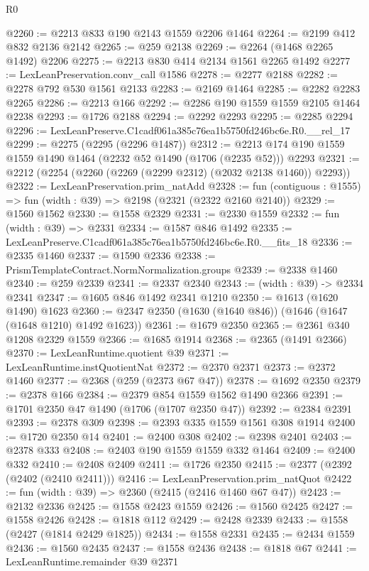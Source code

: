 \begin{lexlean}{R0}
\begin{coremodule}
@2260 := @2213 @833 @190 @2143 @1559 @2206 @1464
@2264 := @2199 @412 @832 @2136 @2142
@2265 := @259 @2138
@2269 := @2264 (@1468 @2265 @1492) @2206
@2275 := @2213 @830 @414 @2134 @1561 @2265 @1492
@2277 := LexLeanPreservation.conv_call @1586
@2278 := @2277 @2188
@2282 := @2278 @792 @530 @1561 @2133
@2283 := @2169 @1464
@2285 := @2282 @2283 @2265
@2286 := @2213 @166
@2292 := @2286 @190 @1559 @1559 @2105 @1464 @2238
@2293 := @1726 @2188
@2294 := @2292 @2293
@2295 := @2285 @2294
@2296 := LexLeanPreserve.C1cadf061a385c76ea1b5750fd246bc6e.R0.__rel_17
@2299 := @2275 (@2295 (@2296 @1487))
@2312 := @2213 @174 @190 @1559 @1559 @1490 @1464 (@2232 @52 @1490 (@1706 (@2235 @52))) @2293
@2321 := @2212 (@2254 (@2260 (@2269 (@2299 @2312) (@2032 @2138 @1460)) @2293))
@2322 := LexLeanPreservation.prim_natAdd
@2328 := fun (contiguous : @1555) => fun (width : @39) => @2198 (@2321 (@2322 @2160 @2140))
@2329 := @1560 @1562
@2330 := @1558 @2329
@2331 := @2330 @1559
@2332 := fun (width : @39) => @2331
@2334 := @1587 @846 @1492
@2335 := LexLeanPreserve.C1cadf061a385c76ea1b5750fd246bc6e.R0.__fits_18
@2336 := @2335 @1460
@2337 := @1590 @2336
@2338 := PrismTemplateContract.NormNormalization.groups
@2339 := @2338 @1460
@2340 := @259 @2339
@2341 := @2337 @2340
@2343 := (width : @39) -> @2334 @2341
@2347 := @1605 @846 @1492 @2341 @1210
@2350 := @1613 (@1620 @1490) @1623
@2360 := @2347 @2350 (@1630 (@1640 @846)) (@1646 (@1647 (@1648 @1210) @1492 @1623))
@2361 := @1679 @2350
@2365 := @2361 @340 @1208 @2329 @1559
@2366 := @1685 @1914
@2368 := @2365 (@1491 @2366)
@2370 := LexLeanRuntime.quotient @39
@2371 := LexLeanRuntime.instQuotientNat
@2372 := @2370 @2371
@2373 := @2372 @1460
@2377 := @2368 (@259 (@2373 @67 @47))
@2378 := @1692 @2350
@2379 := @2378 @166
@2384 := @2379 @854 @1559 @1562 @1490 @2366
@2391 := @1701 @2350 @47 @1490 (@1706 (@1707 @2350 @47))
@2392 := @2384 @2391
@2393 := @2378 @309
@2398 := @2393 @335 @1559 @1561 @308 @1914
@2400 := @1720 @2350 @14
@2401 := @2400 @308
@2402 := @2398 @2401
@2403 := @2378 @333
@2408 := @2403 @190 @1559 @1559 @332 @1464
@2409 := @2400 @332
@2410 := @2408 @2409
@2411 := @1726 @2350
@2415 := @2377 (@2392 (@2402 (@2410 @2411)))
@2416 := LexLeanPreservation.prim_natQuot
@2422 := fun (width : @39) => @2360 (@2415 (@2416 @1460 @67 @47))
@2423 := @2132 @2336
@2425 := @1558 @2423 @1559
@2426 := @1560 @2425
@2427 := @1558 @2426
@2428 := @1818 @112
@2429 := @2428 @2339
@2433 := @1558 (@2427 (@1814 @2429 @1825))
@2434 := @1558 @2331
@2435 := @2434 @1559
@2436 := @1560 @2435
@2437 := @1558 @2436
@2438 := @1818 @67
@2441 := LexLeanRuntime.remainder @39 @2371

\end{coremodule}
\end{lexlean}

